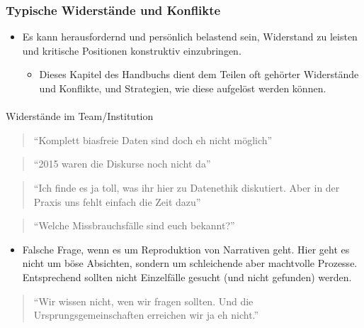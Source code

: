 \documentclass[
  letterpaper,
  DIV=11,
  numbers=noendperiod]{scrartcl}
\makeatletter
\let\oldparagraph\paragraph
\renewcommand{\paragraph}{
    \@ifstar
      \xxxParagraphStar
      \xxxParagraphNoStar
  }
\newcommand{\xxxParagraphStar}[1]{\oldparagraph*{#1}\mbox{}}
\newcommand{\xxxParagraphNoStar}[1]{\oldparagraph{#1}\mbox{}}
\providecommand{\tightlist}{%
  \setlength{\itemsep}{0pt}\setlength{\parskip}{0pt}}\usepackage{longtable,booktabs,array}
\makeatother
\begin{document}
\subsubsection{Typische Widerstände und
Konflikte}\label{typische-widerstuxe4nde-und-konflikte}

\begin{itemize}
\tightlist
\item
  Es kann herausfordernd und persönlich belastend sein, Widerstand zu
  leisten und kritische Positionen konstruktiv einzubringen.

  \begin{itemize}
  \tightlist
  \item
    Dieses Kapitel des Handbuchs dient dem Teilen oft gehörter
    Widerstände und Konflikte, und Strategien, wie diese aufgelöst
    werden können.
  \end{itemize}
\end{itemize}

\paragraph{Widerstände im
Team/Institution}\label{widerstuxe4nde-im-teaminstitution}

\begin{quote}
``Komplett biasfreie Daten sind doch eh nicht möglich''
\end{quote}

\begin{quote}
``2015 waren die Diskurse noch nicht da''
\end{quote}

\begin{quote}
``Ich finde es ja toll, was ihr hier zu Datenethik diskutiert. Aber in
der Praxis uns fehlt einfach die Zeit dazu''
\end{quote}

\begin{quote}
``Welche Missbrauchsfälle sind euch bekannt?''
\end{quote}

\begin{itemize}
\tightlist
\item
  Falsche Frage, wenn es um Reproduktion von Narrativen geht. Hier geht
  es nicht um böse Absichten, sondern um schleichende aber machtvolle
  Prozesse. Entsprechend sollten nicht Einzelfälle gesucht (und nicht
  gefunden) werden.
\end{itemize}

\begin{quote}
``Wir wissen nicht, wen wir fragen sollten. Und die
Ursprungsgemeinschaften erreichen wir ja eh nicht.''
\end{quote}
\end{document}
